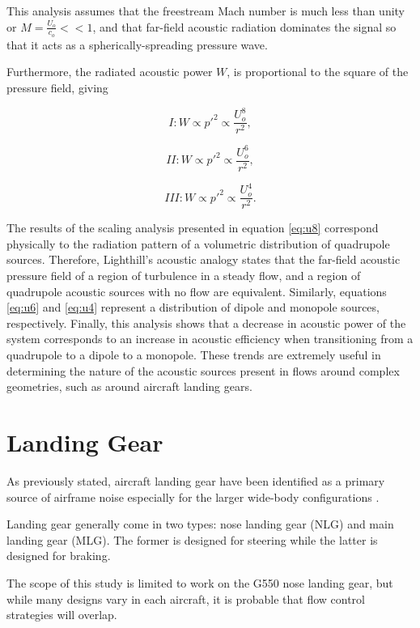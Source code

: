 This analysis assumes that the freestream Mach number is much less than unity or $M = \frac{U_o}{c_o} << 1$, and that far-field acoustic radiation dominates the signal so that it acts as a spherically-spreading pressure wave. 

Furthermore, the radiated acoustic power $W$, is proportional to the square of the pressure field, giving

\begin{equation} \label{eq:u8}
I : W \propto p'^2 \propto \frac{U_o^8}{r^2},
\end{equation}

\begin{equation} \label{eq:u6}
II : W \propto p'^2 \propto \frac{U_o^6}{r^2},
\end{equation}

\begin{equation} \label{eq:u4}
III : W \propto p'^2 \propto \frac{U_o^4}{r^2}.
\end{equation}

The results of the scaling analysis presented in equation \ref{eq:u8} correspond physically to the radiation pattern of a volumetric distribution of quadrupole sources. Therefore, Lighthill's acoustic analogy states that the far-field acoustic pressure field of a region of turbulence in a steady flow, and  a region of quadrupole acoustic sources with no flow are equivalent. Similarly, equations \ref{eq:u6} and \ref{eq:u4} represent a distribution of dipole and monopole sources, respectively. Finally, this analysis shows that a decrease in acoustic power of the system corresponds to an increase in acoustic efficiency when transitioning from a quadrupole to a dipole to a monopole. These trends are extremely useful in determining the nature of the acoustic sources present in flows around complex geometries, such as around aircraft landing gears.

\section{Landing Gear}
As previously stated, aircraft landing gear have been identified as a primary source of airframe noise especially for the larger wide-body configurations \cite{}. 

Landing gear generally come in two types: nose landing gear (NLG) and main landing gear (MLG). The former is designed for steering while the latter is designed for braking. 

The scope of this study is limited to work on the G550 nose landing gear, but while many designs vary in each aircraft, it is probable that flow control strategies will overlap. 


